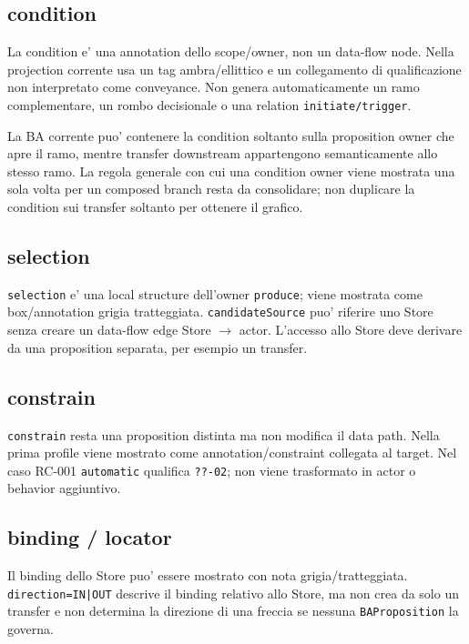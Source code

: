 \documentclass[11pt,a4paper]{article}
\newcommand{\BAP}{\texttt{BAProposition}}
\begin{document}
\subsection{condition}

La condition e' una annotation dello scope/owner, non un data-flow node. Nella projection corrente usa un tag ambra/ellittico e un collegamento di qualificazione non interpretato come conveyance. Non genera automaticamente un ramo complementare, un rombo decisionale o una relation \texttt{initiate/trigger}.

\begin{ddtaopen}[title={Branch-scoped composition pressure}]
La BA corrente puo' contenere la condition soltanto sulla proposition owner che apre il ramo, mentre transfer downstream appartengono semanticamente allo stesso ramo. La regola generale con cui una condition owner viene mostrata una sola volta per un composed branch resta da consolidare; non duplicare la condition sui transfer soltanto per ottenere il grafico.
\end{ddtaopen}

\subsection{selection}

\texttt{selection} e' una local structure dell'owner \texttt{produce}; viene mostrata come box/annotation grigia tratteggiata. \texttt{candidateSource} puo' riferire uno Store senza creare un data-flow edge Store $\rightarrow$ actor. L'accesso allo Store deve derivare da una proposition separata, per esempio un transfer.

\subsection{constrain}

\texttt{constrain} resta una proposition distinta ma non modifica il data path. Nella prima profile viene mostrato come annotation/constraint collegata al target. Nel caso RC-001 \texttt{automatic} qualifica \texttt{??-02}; non viene trasformato in actor o behavior aggiuntivo.

\subsection{binding / locator}

Il binding dello Store puo' essere mostrato con nota grigia/tratteggiata. \texttt{direction=IN|OUT} descrive il binding relativo allo Store, ma non crea da solo un transfer e non determina la direzione di una freccia se nessuna \BAP{} la governa.
\end{document}
